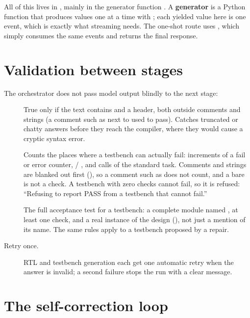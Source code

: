 All of this lives in , mainly in the generator function . A \textbf{generator} is a Python function that produces values one at a time with ; each yielded value here is one event, which is exactly what streaming needs. The one-shot route uses , which simply consumes the same events and returns the final response.

\section{Validation between stages}

The orchestrator does not pass model output blindly to the next stage:

\begin{description}
  \item[] True only if the text contains  and a  header, both outside comments and strings (a comment such as  next to  used to pass). Catches truncated or chatty answers before they reach the compiler, where they would cause a cryptic syntax error.
  \item[] Counts the places where a testbench can actually fail: increments of a fail or error counter,  / ,  and calls of the standard  task. Comments and strings are blanked out first (), so a comment such as  does not count, and a bare  is not a check. A testbench with zero checks cannot fail, so it is refused: ``Refusing to report PASS from a testbench that cannot fail.''
  \item[] The full acceptance test for a testbench: a complete module named , at least one check, and a real instance of the design (), not just a mention of its name. The same rules apply to a testbench proposed by a repair.
  \item[Retry once.] RTL and testbench generation each get one automatic retry when the answer is invalid; a second failure stops the run with a clear message.
\end{description}

\section{The self-correction loop}

